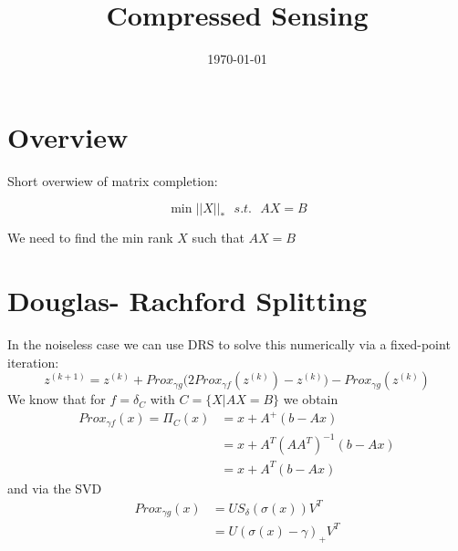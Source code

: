 \documentclass{article}
\title{Compressed Sensing}
\date{\today}
\begin{document}
\maketitle

\section{Overview}

Short overwiew of matrix completion:

$$\min ||X||_* \ \ \ s. t. \ \ \ AX = B$$

We need to find the min rank $X$ such that $AX = B$

\section{Douglas- Rachford Splitting}

In the noiseless case we can use DRS to solve this numerically via a fixed-point iteration: 
$$z^{(k+1)} = z^{(k)} + Prox_{\gamma g}\Big(2 Prox_{\gamma f}(z^{(k)}) - z^{(k)}\Big) - Prox_{\gamma g}(z^{(k)})$$
We know that for $f = \delta_C$ with $C = \lbrace X | AX = B \rbrace$ we obtain
\begin{align*}
Prox_{\gamma f}(x) = \Pi_C(x) &= x + A^+(b-Ax)
\\ &= x + A^T(A A^T)^{-1}(b - Ax)
\\ &= x + A^T(b-Ax)
\end{align*}
and via the SVD
\begin{align*}
Prox_{\gamma g}(x) &= U S_\delta(\sigma(x))V^T
\\ &= U (\sigma(x) - \gamma)_{+} V^T
\end{align*}
\end{document}
